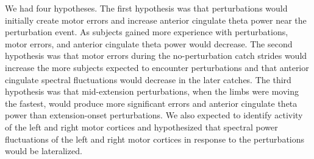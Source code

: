 \documentclass[../thesis_seyed.tex]{subfiles}
\begin{document}
We had four hypotheses. The first hypothesis was that perturbations would initially create motor errors and increase anterior cingulate theta power near the perturbation event. As subjects gained more experience with perturbations, motor errors, and anterior cingulate theta power would decrease. The second hypothesis was that motor errors during the no-perturbation catch strides would increase the more subjects expected to encounter perturbations and that anterior cingulate spectral fluctuations would decrease in the later catches. The third hypothesis was that mid-extension perturbations, when the limbs were moving the fastest, would produce more significant errors and anterior cingulate theta power than extension-onset perturbations. We also expected to identify activity of the left and right motor cortices \cite{Jaeger2014-ao,Kline2016-ci} and hypothesized that spectral power fluctuations of the left and right motor cortices in response to the perturbations would be lateralized.
\end{document}
